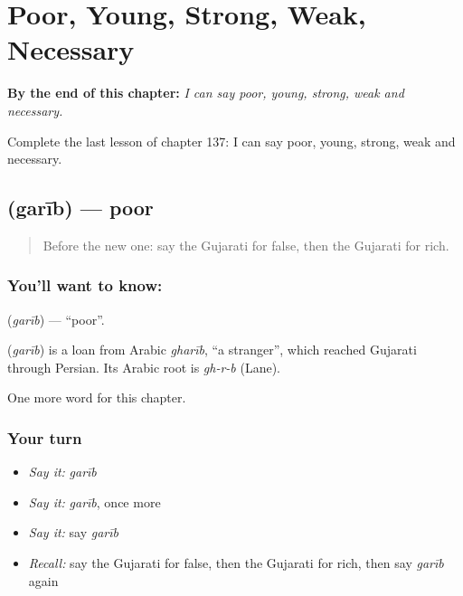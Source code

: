 
\chapter{Poor, Young, Strong, Weak, Necessary}
\label{ch:gu-poor-young-strong-weak-necessary}

\begin{chapteropening}
\textbf{By the end of this chapter:} \emph{I can say poor, young, strong, weak and necessary.}

Complete the last lesson of chapter 137: I can say poor, young, strong, weak and necessary.
\end{chapteropening}

\section[\texorpdfstring{\gu{ગરીબ} (garīb)}{ગરીબ (garīb)}]{ (garīb) — poor}

\label{lesson:GU-C137-garib}



\begin{quote}
Before the new one: say the Gujarati for false, then the Gujarati for rich.
\end{quote}

\subsection*{You'll want to know: }
\textbf{} (\emph{garīb}) — \textquotedblleft{}poor\textquotedblright{}.

\begin{cousinweb}
\textbf{} (\emph{garīb}) is a loan from Arabic \emph{gharīb}, \textquotedblleft{}a stranger\textquotedblright{}, which reached Gujarati through Persian. Its Arabic root is \emph{gh-r-b} (Lane).
\end{cousinweb}

\begin{grammarlens}[title={What you've built}]
One more word for this chapter.
\end{grammarlens}

\subsection*{Your turn}
\begin{itemize}
\raggedright
  \item \emph{Say it:} \emph{garīb}
  \item \emph{Say it:} \emph{garīb}, once more
  \item \emph{Say it:} say \emph{garīb}
  \item \emph{Recall:} say the Gujarati for false, then the Gujarati for rich, then say \emph{garīb} again
\end{itemize}

